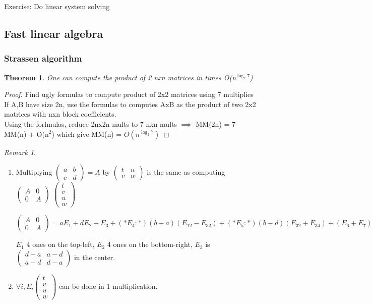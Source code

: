 \documentclass{article}
\newtheorem{theorem}{Theorem}
\theoremstyle{definition}
\theoremstyle{remark}
\newtheorem*{remark}{Remark}
\begin{document}
Exercise: Do linear system solving

\subsection{Fast linear algebra}
\subsubsection{Strassen algorithm}
\begin{theorem}
	One can compute the product of 2 nxn matrices in times O(n$^{\log_2 7}$)
\end{theorem}
\begin{proof}
	Find ugly formulas to compute product of 2x2 matrices using 7 multiplies If A,B have size 2n, use the formulas to computes AxB as the product of two 2x2 matrices with nxn block coefficients.\\
	Using the forlmulas, reduce 2nx2n mults to 7 nxn mults $\implies$ MM(2n) = 7 MM(n) + O(n$^2$) which give MM(n) = $O(n^{\log_2 7})$
\end{proof}

\begin{remark}
	\begin{enumerate}
		\item Multiplying $\begin{pmatrix}
		a&b\\c&d
		\end{pmatrix} = A$ by  $\begin{pmatrix}
		t&u\\v&w
		\end{pmatrix}$ is the same as computing  $\begin{pmatrix}
		A&0\\0&A
		\end{pmatrix} $ $\begin{pmatrix}
			t\\v\\u\\w
		\end{pmatrix}$
		
		 $\begin{pmatrix}
		 A&0\\0&A
		 \end{pmatrix} = aE_1 + dE_2 + E_3 + (*E_4:*) (b-a)(E_{12} - E_{32}) + (*E_5:*)(b-d)(E_{32} + E_{34}) + (E_6 + E_7) (\text{transpose with b replaced by c})$
		 
		 $E_1$ 4 ones on the top-left, $E_2$ 4 ones on the bottom-right, $E_3$ is  $\begin{pmatrix}
		 d-a&a-d\\a-d&d-a
		 \end{pmatrix}$ in the center.
		 \item $\forall i, E_i \begin{pmatrix}
		 	t\\v\\u\\w
		 \end{pmatrix}$ can be done in 1 multiplication.
	\end{enumerate}
\end{remark}
\end{document}
